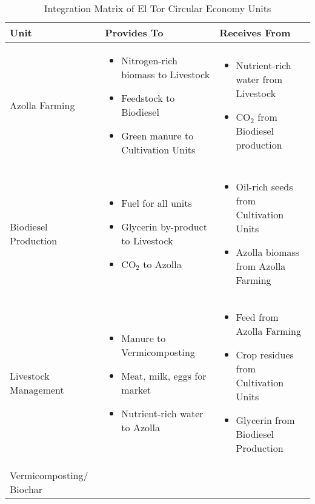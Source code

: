 \begin{table}[h]
\centering
\caption{Integration Matrix of El Tor Circular Economy Units}
\label{tab:integration_matrix}
\begin{tabular}{|p{2.5cm}|p{5cm}|p{5cm}|}
\hline
\textbf{Unit} & \textbf{Provides To} & \textbf{Receives From} \\
\hline
Azolla Farming & 
\begin{itemize}
    \item Nitrogen-rich biomass to Livestock
    \item Feedstock to Biodiesel
    \item Green manure to Cultivation Units
\end{itemize} & 
\begin{itemize}
    \item Nutrient-rich water from Livestock
    \item CO$_2$ from Biodiesel production
\end{itemize} \\
\hline
Biodiesel Production & 
\begin{itemize}
    \item Fuel for all units
    \item Glycerin by-product to Livestock
    \item CO$_2$ to Azolla
\end{itemize} & 
\begin{itemize}
    \item Oil-rich seeds from Cultivation Units
    \item Azolla biomass from Azolla Farming
\end{itemize} \\
\hline
Livestock Management & 
\begin{itemize}
    \item Manure to Vermicomposting
    \item Meat, milk, eggs for market
    \item Nutrient-rich water to Azolla
\end{itemize} & 
\begin{itemize}
    \item Feed from Azolla Farming
    \item Crop residues from Cultivation Units
    \item Glycerin from Biodiesel Production
\end{itemize} \\
\hline
Vermicomposting/ Biochar & 
\begin{itemize}

\end{itemize}
\end{tabular}
\end{table}
